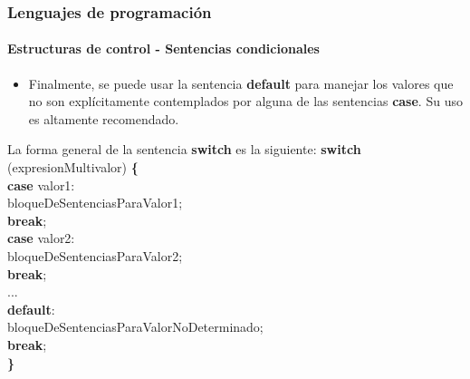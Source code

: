 \documentclass{beamer}
\begin{document}
\begin{frame}
  \frametitle{Lenguajes de programación}
  \framesubtitle{Estructuras de control - Sentencias condicionales}

  \begin{itemize}
  \item Finalmente, se puede usar la sentencia \textbf{default} para manejar los valores que no son explícitamente contemplados por alguna de las sentencias \textbf{case}. Su uso es altamente recomendado.
  \end{itemize}

  \begin{block}{La forma general de la sentencia \textbf{switch} es la siguiente:}
    {\scriptsize
      \textbf{switch} (expresionMultivalor) \textbf{\{} \\
      \hspace{0.3cm} \textbf{case} valor1: \\
      \hspace{0.6cm} bloqueDeSentenciasParaValor1; \\
      \hspace{0.6cm} \textbf{break}; \\
      \hspace{0.3cm} \textbf{case} valor2: \\
      \hspace{0.6cm} bloqueDeSentenciasParaValor2; \\
      \hspace{0.6cm} \textbf{break}; \\
      \hspace{0.3cm}...\\
      \hspace{0.3cm} \textbf{default}: \\
      \hspace{0.6cm} bloqueDeSentenciasParaValorNoDeterminado; \\
      \hspace{0.6cm} \textbf{break}; \\
      \textbf{\}}
    }
  \end{block}
\end{frame}
\end{document}
